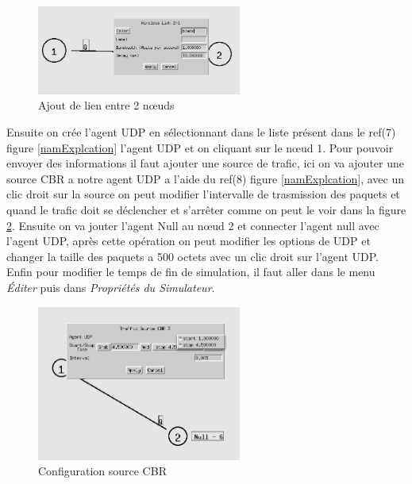 \documentclass[11pt]{article}
\begin{document}
\begin{figure}[H]
	\begin{center}
		\includegraphics[width=0.6\textwidth]{assets/tp1/ajoutLienNoeud.png}
	\end{center}
	\caption{Ajout de lien entre 2 nœuds}
	\label{ajoutLien}
\end{figure}

Ensuite on crée l'agent UDP en sélectionnant dans le liste présent dans le ref(7) figure \ref{namExplcation} l'agent UDP et on cliquant sur le nœud 1. Pour pouvoir envoyer des informations il faut ajouter une source de trafic, ici on va ajouter une source CBR a notre agent UDP a l'aide du ref(8) figure \ref{namExplcation}, avec un clic droit sur la source on peut modifier l'intervalle de trasmission des paquets et quand le trafic doit se déclencher et s’arrêter comme on peut le voir dans la figure \ref{modifCBR}. Ensuite on va jouter l'agent Null au nœud 2 et connecter l'agent null avec l'agent UDP, après cette opération on peut modifier les options de UDP et changer la taille des paquets a 500 octets avec un clic droit sur l'agent UDP. Enfin pour modifier le temps de fin de simulation, il faut aller dans le menu \textit{Éditer} puis dans \textit{Propriétés du Simulateur}.

\begin{figure}[H]
	\begin{center}
		\includegraphics[width=0.6\textwidth]{assets/tp1/modifCBR.png}
	\end{center}
	\caption{Configuration source CBR}
	\label{modifCBR}
\end{figure}
\end{document}
